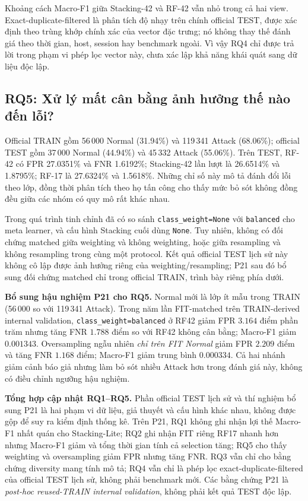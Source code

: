 Khoảng cách Macro-F1 giữa Stacking-42 và RF-42 vẫn nhỏ trong cả hai view. Exact-duplicate-filtered là phân tích độ nhạy trên chính official TEST, được xác định theo trùng khớp chính xác của vector đặc trưng; nó không thay thế đánh giá theo thời gian, host, session hay benchmark ngoài. Vì vậy RQ4 chỉ được trả lời trong phạm vi phép lọc vector này, chưa xác lập khả năng khái quát sang dữ liệu độc lập.

\subsection{RQ5: Xử lý mất cân bằng ảnh hưởng thế nào đến lỗi?}
\label{sec:revision-rq5}
Official TRAIN gồm 56\,000 Normal (31.94\%) và 119\,341 Attack (68.06\%); official TEST gồm 37\,000 Normal (44.94\%) và 45\,332 Attack (55.06\%). Trên TEST, RF-42 có FPR 27.0351\% và FNR 1.6192\%; Stacking-42 lần lượt là 26.6514\% và 1.8795\%; RF-17 là 27.6324\% và 1.5618\%. Những chỉ số này mô tả đánh đổi lỗi theo lớp, đồng thời phân tích theo họ tấn công cho thấy mức bỏ sót không đồng đều giữa các nhóm có quy mô rất khác nhau.

Trong quá trình tinh chỉnh đã có so sánh \texttt{class\_weight=None} với \texttt{balanced} cho meta learner, và cấu hình Stacking cuối dùng \texttt{None}. Tuy nhiên, không có đối chứng matched giữa weighting và không weighting, hoặc giữa resampling và không resampling trong cùng một protocol. Kết quả official TEST lịch sử này không cô lập được ảnh hưởng riêng của weighting/resampling; P21 sau đó bổ sung đối chứng matched chỉ trong official TRAIN, trình bày riêng phía dưới.

\noindent\textbf{Bổ sung hậu nghiệm P21 cho RQ5.}
Normal mới là lớp ít mẫu trong TRAIN (56\,000 so với 119\,341 Attack). Trong năm lần FIT-matched trên TRAIN-derived internal validation, \texttt{class\_weight=balanced} ở RF42 giảm FPR $3.164$ điểm phần trăm nhưng tăng FNR $1.788$ điểm so với RF42 không cân bằng; Macro-F1 giảm $0.001343$. Oversampling ngẫu nhiên \emph{chỉ trên FIT Normal} giảm FPR $2.209$ điểm và tăng FNR $1.168$ điểm; Macro-F1 giảm trung bình $0.000334$. Cả hai nhánh giảm cảnh báo giả nhưng làm bỏ sót nhiều Attack hơn trong đánh giá này, không có điều chỉnh ngưỡng hậu nghiệm.

\noindent\textbf{Tổng hợp cập nhật RQ1--RQ5.} Phần official TEST lịch sử và thí nghiệm bổ sung P21 là hai phạm vi dữ liệu, giả thuyết và cấu hình khác nhau, không được gộp để suy ra kiểm định thống kê. Trên P21, RQ1 không ghi nhận lợi thế Macro-F1 nhất quán cho Stacking-Lite; RQ2 ghi nhận FIT riêng RF17 nhanh hơn nhưng Macro-F1 giảm và tổng thời gian tính cả selection tăng; RQ5 cho thấy weighting và oversampling giảm FPR nhưng tăng FNR. RQ3 vẫn chỉ cho bằng chứng diversity mang tính mô tả; RQ4 vẫn chỉ là phép lọc exact-duplicate-filtered của official TEST lịch sử, không phải benchmark mới. Các bằng chứng P21 là \emph{post-hoc reused-TRAIN internal validation}, không phải kết quả TEST độc lập.
